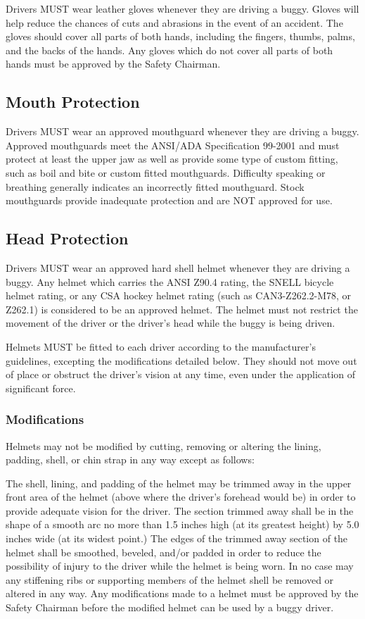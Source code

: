 	Drivers MUST wear leather gloves whenever they are driving a buggy. Gloves will
	help reduce the chances of cuts and abrasions in the event of an accident. The
	gloves should cover all parts of both hands, including the fingers, thumbs,
	palms, and the backs of the hands. Any gloves which do not cover all parts of
	both hands must be approved by the Safety Chairman.

\subsection{Mouth Protection}

	Drivers MUST wear an approved mouthguard whenever they are driving a buggy. Approved mouthguards meet the ANSI/ADA Specification 99-2001 and must
	protect at least the upper jaw as well as provide some type of custom fitting,
	such as boil and bite or custom fitted mouthguards. Difficulty speaking or
	breathing generally indicates an incorrectly fitted mouthguard. Stock mouthguards
	provide inadequate protection and are NOT approved for use.

\subsection{Head Protection}

	Drivers MUST wear an approved hard shell helmet whenever they are driving a
	buggy. Any helmet which carries the ANSI Z90.4 rating, the SNELL bicycle helmet
	rating, or any CSA hockey helmet rating (such as CAN3-Z262.2-M78, or Z262.1) is
	considered to be an approved helmet. The helmet must not restrict the movement
	of the driver or the driver's head while the buggy is being driven.

    Helmets MUST be fitted to each driver according to the manufacturer's
    guidelines, excepting the modifications detailed below. They should not move
    out of place or obstruct the driver's vision at any time, even under
    the application of significant force.

\subsubsection{Modifications}

	Helmets may not be modified by cutting, removing or altering the lining,
	padding, shell, or chin strap in any way except as follows:
	\newline

	The shell, lining, and padding of the helmet may be trimmed away in the upper
	front area of the helmet (above where the driver's forehead would be) in order
	to provide adequate vision for the driver. The section trimmed away shall be in
	the shape of a smooth arc no more than 1.5 inches high (at its greatest height)
	by 5.0 inches wide (at its widest point.) The edges of the trimmed away section
	of the helmet shall be smoothed, beveled, and/or padded in order to reduce the
	possibility of injury to the driver while the helmet is being worn. In no case
	may any stiffening ribs or supporting members of the helmet shell be removed or
	altered in any way. Any modifications made to a helmet must be approved by the
	Safety Chairman before the modified helmet can be used by a buggy driver.

